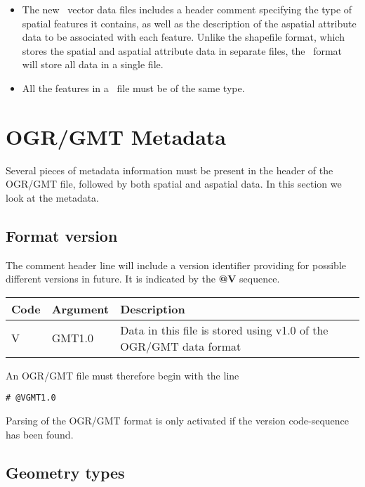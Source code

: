 \begin{itemize}
\item The new \GMT\ vector data files includes a header comment specifying
the type of spatial features it contains, as well as the description of
the aspatial attribute data to be associated with each feature. Unlike
the shapefile format, which stores the spatial and aspatial attribute
data in separate files, the \GMT\ format will store all data in a single
file.

\item  All the features in a \GMT\ file must be of the same type.
\end{itemize}

\section{OGR/GMT Metadata}

Several pieces of metadata information must be present in the header of the OGR/GMT file,
followed by both spatial and aspatial data.  In this section we look at the metadata.

\subsection{Format version}

The comment header line will include a version identifier providing for
possible different versions in future.  It is indicated by the \textbf{@V} sequence.

\begin{table}[h]
\small
\centering
\begin{tabular}{lll} \hline
\textbf{Code}	&	\textbf{Argument}	&	\textbf{Description} \\ \hline \hline
V & GMT1.0 & Data in this file is stored using v1.0 of the OGR/GMT data format \\
\end{tabular}
\label{tbl:Q1}
\end{table} 
An OGR/GMT file must therefore begin with the line

\begin{verbatim}
# @VGMT1.0
\end{verbatim}
Parsing of the OGR/GMT format is only activated if the version code-sequence has been found.

\subsection{Geometry types}

